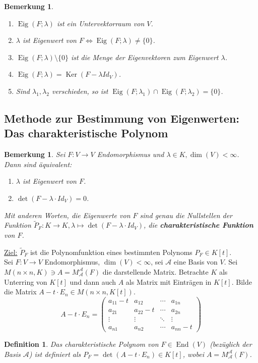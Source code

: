 \documentclass[12pt,a4paper]{article}
\theoremstyle{plain}
\newtheorem{Definition}[Theorem]{Definition}
\newtheorem{Bemerkung}[Theorem]{Bemerkung}
\numberwithin{equation}{section}
\begin{document}
\begin{Bemerkung} \mbox{ }
\begin{enumerate}
\renewcommand{\labelenumi}{\alph{enumi})}
\item $\operatorname{Eig}(F;\lambda)$ ist ein Untervektorraum von $V$.
\item $\lambda$ ist Eigenwert von $F \Leftrightarrow \operatorname{Eig}(F;\lambda)\neq \{0\}$.
\item $\operatorname{Eig}(F;\lambda)\setminus\{0\}$ ist die Menge der Eigenvektoren zum Eigenwert $\lambda$.
\item $\operatorname{Eig}(F;\lambda)=\operatorname{Ker}(F - \lambda Id_V )$.
\item Sind $\lambda_1, \lambda_2$ verschieden, so ist $\operatorname{Eig}(F;\lambda_1)\cap \operatorname{Eig}(F;\lambda_2)=\{0\}$.
\end{enumerate}
\end{Bemerkung}
\subsection{Methode zur Bestimmung von Eigenwerten: Das charakteristische Polynom}
\begin{Bemerkung}
Sei $F:V\rightarrow V$ Endomorphismus und $\lambda \in K, \dim(V)<\infty$. Dann sind äquivalent: \begin{enumerate}
\renewcommand{\labelenumi}{\roman{enumi})}
\item $\lambda$ ist Eigenwert von $F$.
\item $\det(F-\lambda\cdot Id_V) = 0$.
\end{enumerate}
Mit anderen Worten, die Eigenwerte von $F$ sind genau die Nullstellen der Funktion $\tilde{P}_F : K\rightarrow K, \lambda \mapsto \det(F - \lambda\cdot Id_V)$, die \textbf{charakteristische Funktion} von $F$.
\end{Bemerkung}
\underline{Ziel:} $\tilde{P}_F$ ist die Polynomfunktion eines bestimmten Polynoms $P_F\in K[t]$.\\
Sei $F:V\rightarrow V$ Endomorphismus, $\dim(V)<\infty$, sei $\mathcal{A}$ eine Basis von $V$. Sei $M(n\times n,K) \ni A=M_\mathcal{A}^\mathcal{A}(F)$ die darstellende Matrix. Betrachte $K$ als Unterring von $K[t]$ und dann auch $A$ als Matrix mit Einträgen in $K[t]$. Bilde die Matrix $A-t\cdot E_n \in M(n\times n, K[t])$.\[
A-t\cdot E_n = \begin{pmatrix}
a_{11}-t & a_{12} & \cdots & a_{1n} \\
a_{21} & a_{22}-t & \cdots & a_{2n} \\
\vdots & \vdots & \ddots & \vdots \\
a_{n1} & a_{n2} & \cdots & a_{nn}-t
\end{pmatrix}
\]
\begin{Definition}
Das charakteristische Polynom von $F\in\operatorname{End}(V)$ (bezüglich der Basis $\mathcal{A}$) ist definiert als $P_F=\det(A-t\cdot E_n)\in K[t]$, wobei $A=M_\mathcal{A}^\mathcal{A}(F)$.
\end{Definition}
\end{document}
